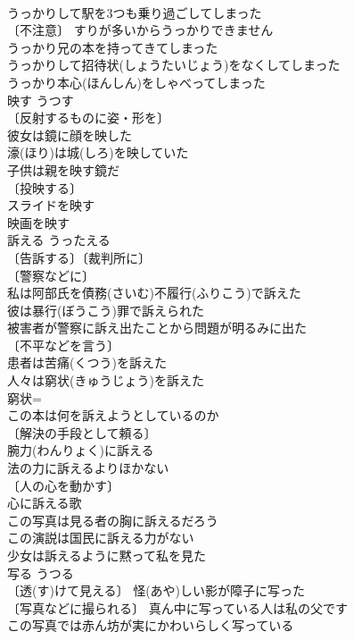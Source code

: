\documentclass[8pt]{extreport}
\begin{document}
\begin{CJK}{UTF8}{min}
\\	うっかりして駅を3つも乗り過ごしてしまった 
\\	〔不注意〕 すりが多いからうっかりできません 
\\	うっかり兄の本を持ってきてしまった 
\\	うっかりして招待状(しょうたいじょう)をなくしてしまった 
\\	うっかり本心(ほんしん)をしゃべってしまった 
\\	映す	うつす	
\\	〔反射するものに姿・形を〕
\\	彼女は鏡に顔を映した 
\\	濠(ほり)は城(しろ)を映していた 
\\	子供は親を映す鏡だ 
\\	〔投映する〕
\\	スライドを映す 
\\	映画を映す 
\\	訴える	うったえる	
\\	〔告訴する〕〔裁判所に〕
\\	〔警察などに〕
\\	私は阿部氏を債務(さいむ)不履行(ふりこう)で訴えた 
\\	彼は暴行(ぼうこう)罪で訴えられた 
\\	被害者が警察に訴え出たことから問題が明るみに出た 
\\	〔不平などを言う〕
\\	患者は苦痛(くつう)を訴えた 
\\	人々は窮状(きゅうじょう)を訴えた 
\\	窮状=
\\	この本は何を訴えようとしているのか 
\\	〔解決の手段として頼る〕
\\	腕力(わんりょく)に訴える 
\\	法の力に訴えるよりほかない 
\\	〔人の心を動かす〕
\\	心に訴える歌 
\\	この写真は見る者の胸に訴えるだろう 
\\	この演説は国民に訴える力がない 
\\	少女は訴えるように黙って私を見た 
\\	写る	うつる	
\\	〔透(す)けて見える〕 怪(あや)しい影が障子に写った 
\\	〔写真などに撮られる〕 真ん中に写っている人は私の父です 
\\	この写真では赤ん坊が実にかわいらしく写っている 

\end{CJK}
\end{document}
